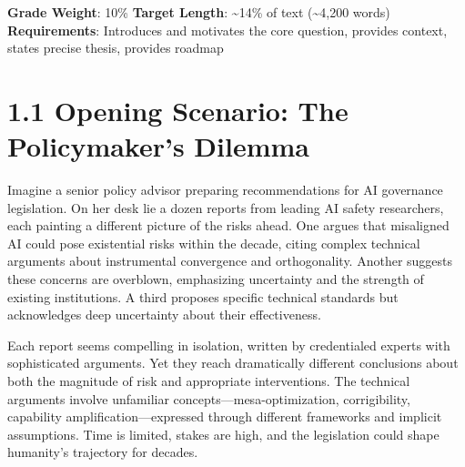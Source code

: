\documentclass[
  11pt,
  letterpaper,
]{book}
\begin{document}

\begin{tcolorbox}[enhanced jigsaw, opacityback=0, leftrule=.75mm, breakable, coltitle=black, colbacktitle=quarto-callout-note-color!10!white, bottomrule=.15mm, rightrule=.15mm, toprule=.15mm, left=2mm, bottomtitle=1mm, arc=.35mm, toptitle=1mm, titlerule=0mm, title=\textcolor{quarto-callout-note-color}{\faInfo}\hspace{0.5em}{Chapter Overview}, opacitybacktitle=0.6, colframe=quarto-callout-note-color-frame, colback=white]

\textbf{Grade Weight}: 10\% \textbar{} \textbf{Target Length}:
\textasciitilde14\% of text (\textasciitilde4,200 words)\\
\textbf{Requirements}: Introduces and motivates the core question,
provides context, states precise thesis, provides roadmap

\end{tcolorbox}

\section*{1.1 Opening Scenario: The Policymaker's
Dilemma}\label{sec-opening-scenario}


Imagine a senior policy advisor preparing recommendations for AI
governance legislation. On her desk lie a dozen reports from leading AI
safety researchers, each painting a different picture of the risks
ahead. One argues that misaligned AI could pose existential risks within
the decade, citing complex technical arguments about instrumental
convergence and orthogonality. Another suggests these concerns are
overblown, emphasizing uncertainty and the strength of existing
institutions. A third proposes specific technical standards but
acknowledges deep uncertainty about their effectiveness.

Each report seems compelling in isolation, written by credentialed
experts with sophisticated arguments. Yet they reach dramatically
different conclusions about both the magnitude of risk and appropriate
interventions. The technical arguments involve unfamiliar
concepts---mesa-optimization, corrigibility, capability
amplification---expressed through different frameworks and implicit
assumptions. Time is limited, stakes are high, and the legislation could
shape humanity's trajectory for decades.
\end{document}
